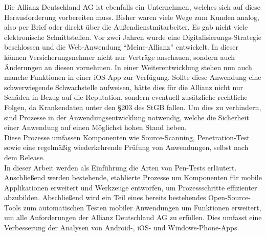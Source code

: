 Die Allianz Deutschland AG ist ebenfalls ein Unternehmen, welches sich auf diese Herausforderung vorbereiten muss. Bisher waren viele Wege zum Kunden analog, also per Brief oder direkt über die Außendienstmitarbeiter. Es gab nicht viele elektronische Schnittstellen. Vor zwei Jahren wurde eine Digitalisierungs-Strategie beschlossen und die Web-Anwendung "`Meine-Allianz"' entwickelt. In dieser können Versicherungsnehmer nicht nur Verträge anschauen, sondern auch Änderungen an diesen vornehmen. In einer Weiterentwicklung stehen nun auch manche Funktionen in einer iOS-App zur Verfügung. Sollte diese Anwendung eine schwerwiegende Schwachstelle aufweisen, hätte dies für die Allianz nicht nur Schäden in Bezug auf die Reputation, sondern eventuell zusätzliche rechtliche Folgen, da Krankendaten unter den §203 des StGB fallen. Um dies zu verhindern, sind Prozesse in der Anwendungsentwicklung notwendig, welche die Sicherheit einer Anwendung auf einen Möglichst hohen Stand heben.\\

Diese Prozesse umfassen Komponenten wie Source-Scanning, Penetration-Test sowie eine regelmäßig wiederkehrende Prüfung von Anwendungen, selbst nach dem Release.\\

In dieser Arbeit werden als Einführung die Arten von Pen-Tests erläutert. Anschließend werden bestehende, etablierte Prozesse um Komponenten für mobile Applikationen erweitert und Werkzeuge entworfen, um Prozessschritte effizienter abzubilden. Abschließend wird ein Teil eines bereits bestehendes Open-Source-Tools zum automatischen Testen mobiler Anwendungen um Funktionen erweitert, um alle Anforderungen der Allianz Deutschland AG zu erfüllen. Dies umfasst eine Verbesserung der Analysen von Android-, iOS- und Windows-Phone-Apps.